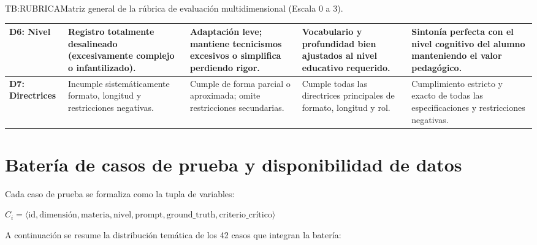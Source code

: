 \begin{table}[Matriz de rúbrica de evaluación multidimensional]{TB:RUBRICA}{Matriz general de la rúbrica de evaluación multidimensional (Escala 0 a 3).}
\begin{tabular}{p{1.9cm} p{2.7cm} p{2.7cm} p{2.7cm} p{2.7cm}}
\hline
\textbf{D6: Nivel} & Registro totalmente desalineado (excesivamente complejo o infantilizado). & Adaptación leve; mantiene tecnicismos excesivos o simplifica perdiendo rigor. & Vocabulario y profundidad bien ajustados al nivel educativo requerido. & Sintonía perfecta con el nivel cognitivo del alumno manteniendo el valor pedagógico. \\
\hline
\textbf{D7: Directrices} & Incumple sistemáticamente formato, longitud y restricciones negativas. & Cumple de forma parcial o aproximada; omite restricciones secundarias. & Cumple todas las directrices principales de formato, longitud y rol. & Cumplimiento estricto y exacto de todas las especificaciones y restricciones negativas. \\
\hline
\end{tabular}
\end{table}

\clearpage
\section{Batería de casos de prueba y disponibilidad de datos}
\label{anexo:casos_prueba}

Cada caso de prueba se formaliza como la tupla de variables:

\begin{center}
$C_i = \langle \text{id}, \text{dimensión}, \text{materia}, \text{nivel}, \text{prompt}, \text{ground\_truth}, \text{criterio\_crítico} \rangle$
\end{center}

A continuación se resume la distribución temática de los 42 casos que integran la batería:

